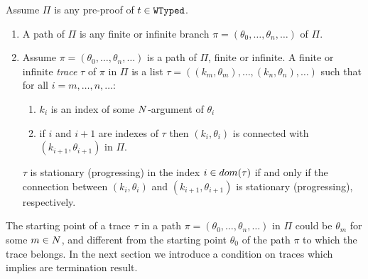 \begin{definition}
\label{definition-progressing-trace}
Assume $\Pi$ is any pre-proof of $t \in {\tt WTyped}$.
\begin{enumerate}
\item
A path of $\Pi$ is any finite or infinite branch $\pi =(\theta_0, \ldots, \theta_n, \ldots)$ of $\Pi$.
\item
Assume $\pi =(\theta_0, \ldots, \theta_n, \ldots)$ is a path of $\Pi$, finite or infinite. 
A finite or infinite \emph{trace} $\tau$ of $\pi$ in $\Pi$ is a list 
$\tau =( (k_m,\theta_m), \ldots, (k_n,\theta_n), \ldots)$ such that for all $i=m,\ldots, n,\ldots$:
\begin{enumerate}
\item
$k_i$ is an index of some ${N}$-argument of $\theta_i$
\item
if $i$ and $i+1$ are indexes of $\tau$ then  $(k_i, \theta_i)$
is connected with $(k_{i+1},\theta_{i+1})$ in $\Pi$.
\end{enumerate}
$\tau$ is stationary (progressing) in the index $i \in {{\relax dom}}(\tau)$ if and only if the connection 
between $(k_i,\theta_i)$ and $(k_{i+1},\theta_{i+1})$ is stationary (progressing),
respectively.
\end{enumerate}
\end{definition}

The starting point of a trace $\tau$ in a path  $\pi =(\theta_0, \ldots, \theta_n, \ldots)$
in $\Pi$ could be $\theta_m$ for some $m \in {N}$, 
and different from the starting point $\theta_0$ of the path $\pi$ to which the 
trace belongs. 
In the next section we introduce a condition on traces which implies are termination result.

